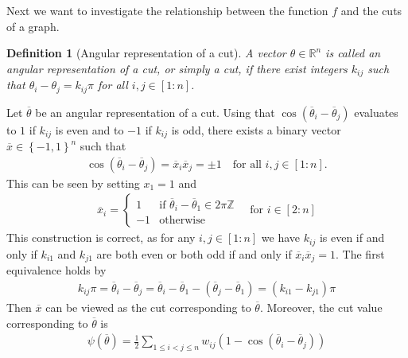 \documentclass[12pt,a4paper]{article}
\theoremstyle{mythm}
\newtheorem{Def}[thm]{Definition}
\begin{document}
Next we want to investigate the relationship between the function $ f $ and the cuts of a graph.
\begin{Def}[Angular representation of a cut]
  A vector $ \theta \in \mathbb{R} ^{ n }  $ is called an angular representation of a cut, or simply a cut, if there exist integers $ k _{ ij }  $ such that $ \theta_i - \theta_j = k _{ ij }
\pi$ for all $ i,j \in \left[ 1:n \right]  $.
\end{Def} 
Let $ \overline{ \theta }  $ be an angular representation of a cut.
Using that $ \cos( \overline{ \theta }  _{ i } - \overline{ \theta} _{ j }  )  $ evaluates to $ 1 $ if $ k _{ ij }  $ is even and to $ -1 $ if $ k _{ij} $ is odd,
there exists a binary vector $ \overline{ x } \in \left\{ -1,1 \right\} ^{ n }  $  such that
\begin{align}
\label{eq:cutrel} 
\cos( \overline{ \theta } _{ i } - \overline{ \theta }  _{ j } ) = \overline{ x } _{ i } \overline{ x } _{ j } = \pm 1 \quad \text{for all } i,j \in \left[ 1:n \right].
\end{align} 
This can be seen by setting $ x_1 = 1 $ and 
\begin{align*}
\overline{ x }  _{ i } = \begin{cases}
1 & \text{if } \overline{ \theta}_i - \overline{ \theta}_1 \in 2 \pi \mathbb{Z} \\
-1 & \text{otherwise} 
\end{cases}
\quad \text{for } i \in \left[ 2:n \right] 
\end{align*} 
This construction is correct, as for any $ i,j \in \left[ 1:n \right]  $ we have  $ k _{
ij }  $ is even if and only if $ k _{ i1 }  $ and $ k _{ j1 } $ are both even or both odd if and only if $ \overline{ x } _i \overline{ x } _j = 1 $.
The first equivalence holds by
\begin{align*}
 k _{ ij } \pi = \overline{ \theta} _{ i } - \overline{ \theta} _{ j } = \overline{ \theta} _{ i } - \overline{ \theta} _{ 1 } - ( \overline{ \theta} _{ j
} - \overline{ \theta} _{ 1 } ) = ( k _{ i1 } - k _{ j1 } ) \pi 
\end{align*} 
Then $ \overline{ x }  $ can be viewed as the cut corresponding to $ \overline{ \theta }  $.
Moreover, the cut value corresponding to $ \overline{ \theta }  $ is
\begin{align}
\label{eq:psiRelaxedCut} 
\psi ( \overline{ \theta } ) = \frac{ 1 }{ 2 } \sum_{ 1 \leq i < j \leq n  }^{  } w _{ ij } \left( 1 - \cos( \overline{ \theta } _{ i } - \overline{ \theta } _{ j }  )  \right) 
\end{align} 
\end{document}

